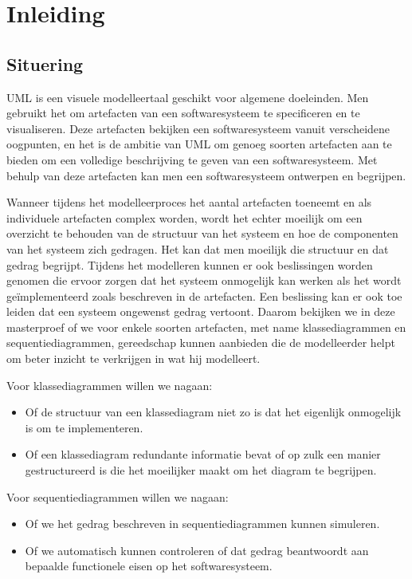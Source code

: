 \chapter{Inleiding}

\section{Situering}\label{sec:situering}

UML\cite{RumbaughJames2005Tuml} is een visuele modelleertaal geschikt voor algemene doeleinden. Men gebruikt het om artefacten van een softwaresysteem te specificeren en te visualiseren. Deze artefacten bekijken een softwaresysteem vanuit verscheidene oogpunten, en het is de ambitie van UML om genoeg soorten artefacten aan te bieden om een volledige beschrijving te geven van een softwaresysteem. Met behulp van deze artefacten kan men een softwaresysteem ontwerpen en begrijpen.

Wanneer tijdens het modelleerproces het aantal artefacten toeneemt en als individuele artefacten complex worden, wordt het echter moeilijk om een overzicht te behouden van de structuur van het systeem en hoe de componenten van het systeem zich gedragen. Het kan dat men moeilijk die structuur en dat gedrag begrijpt. Tijdens het modelleren kunnen er ook beslissingen worden genomen die ervoor zorgen dat het systeem onmogelijk kan werken als het wordt ge\"implementeerd zoals beschreven in de artefacten. Een beslissing kan er ook toe leiden dat een systeem ongewenst gedrag vertoont. Daarom bekijken we in deze masterproef of we voor enkele soorten artefacten, met name klassediagrammen en sequentiediagrammen, gereedschap kunnen aanbieden die de modelleerder helpt om beter inzicht te verkrijgen in wat hij modelleert.

Voor klassediagrammen willen we nagaan:

\begin{itemize}
	\item Of de structuur van een klassediagram niet zo is dat het eigenlijk onmogelijk is om te implementeren.
	\item Of een klassediagram redundante informatie bevat of op zulk een manier gestructureerd is die het moeilijker maakt om het diagram te begrijpen.
\end{itemize}

Voor sequentiediagrammen willen we nagaan:

\begin{itemize}
	\item Of we het gedrag beschreven in sequentiediagrammen kunnen simuleren.
	\item Of we automatisch kunnen controleren of dat gedrag beantwoordt aan bepaalde functionele eisen op het softwaresysteem.
\end{itemize} 

